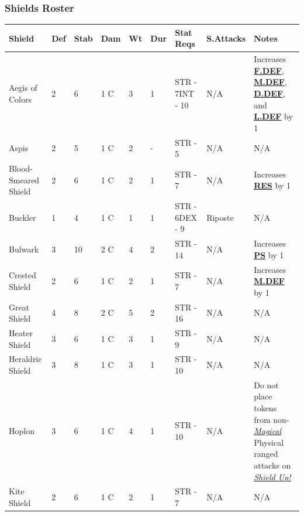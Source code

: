 \documentclass[12pt]{article}
\newcommand{\refto}[1]{\hyperlink{#1}{\textbf{#1}}}
\newcommand{\reftoit}[1]{\hyperlink{#1}{\emph{#1}}}
\begin{document}
\subsubsection*{Shields Roster}
\begin{center}
\begin{tabularx}{\textwidth}{p{}p{}p{}p{}p{}p{}p{}p{}p{}}
\hline
\rowcolor{white} \textbf{Shield} & \textbf{Def} & \textbf{Stab} & \textbf{Dam} & \textbf{Wt} & \textbf{Dur} & \textbf{Stat Reqs} & \textbf{S.Attacks} & \textbf{Notes}\setcounter{rownum}{0}\\
\hline
Aegis of Colors & 2 & 6 & 1 C & 3 & 1 & STR - 7\newline INT - 10 & N/A & Increases \refto{F.DEF}, \refto{M.DEF}, \refto{D.DEF}, and \refto{L.DEF} by 1\\
Aspis & 2 & 5 & 1 C & 2 & - & STR - 5 & N/A & N/A\\
Blood-Smeared Shield & 2 & 6 & 1 C & 2 & 1 & STR - 7 & N/A & Increases \refto{RES} by 1\\
Buckler & 1 & 4 & 1 C & 1 & 1 & STR - 6\newline DEX - 9 & Riposte & N/A\\
Bulwark & 3 & 10 & 2 C & 4 & 2 & STR - 14 & N/A & Increases \refto{PS} by 1\\
Crested Shield & 2 & 6 & 1 C & 2 & 1 & STR - 7 & N/A & Increases \refto{M.DEF} by 1\\
Great Shield & 4 & 8 & 2 C & 5 & 2 & STR - 16 & N/A & N/A\\
Heater Shield & 3 & 6 & 1 C & 3 & 1 & STR - 9 & N/A & N/A\\
Heraldric Shield & 3 & 8 & 1 C & 3 & 1 & STR - 10 & N/A & N/A\\
Hoplon & 3 & 6 & 1 C & 4 & 1 & STR - 10 & N/A & Do not place tokens from non-\reftoit{Magical} Physical ranged attacks on \reftoit{Shield Up!}\\
Kite Shield & 2 & 6 & 1 C & 2 & 1 & STR - 7 & N/A & N/A\\
\hline
\end{tabularx}
\end{center}

\pagebreak
\end{document}
